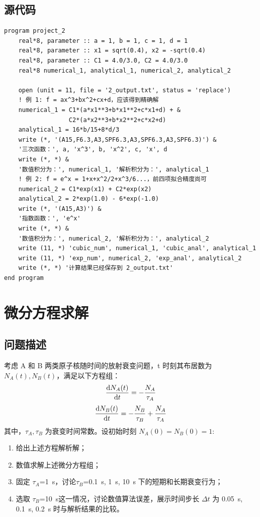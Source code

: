 \documentclass{ctexart}
\begin{document}
\subsection{源代码}
\begin{lstlisting}
program project_2
	real*8, parameter :: a = 1, b = 1, c = 1, d = 1
	real*8, parameter :: x1 = sqrt(0.4), x2 = -sqrt(0.4)
	real*8, parameter :: C1 = 4.0/3.0, C2 = 4.0/3.0
	real*8 numerical_1, analytical_1, numerical_2, analytical_2

	open (unit = 11, file = '2_output.txt', status = 'replace')
	! 例 1: f = ax^3+bx^2+cx+d，应该得到精确解
	numerical_1 = C1*(a*x1**3+b*x1**2+c*x1+d) + &
	              C2*(a*x2**3+b*x2**2+c*x2+d)
	analytical_1 = 16*b/15+8*d/3
	write (*, '(A15,F6.3,A3,SPF6.3,A3,SPF6.3,A3,SPF6.3)') &
	'三次函数：', a, 'x^3', b, 'x^2', c, 'x', d
	write (*, *) &
	'数值积分为：', numerical_1, '解析积分为：', analytical_1
	! 例 2: f = e^x = 1+x+x^2/2+x^3/6...，前四项拟合精度尚可
	numerical_2 = C1*exp(x1) + C2*exp(x2)
	analytical_2 = 2*exp(1.0) - 6*exp(-1.0)
	write (*, '(A15,A3)') &
	'指数函数：', 'e^x'
	write (*, *) &
	'数值积分为：', numerical_2, '解析积分为：', analytical_2
	write (11, *) 'cubic_num', numerical_1, 'cubic_anal', analytical_1
	write (11, *) 'exp_num', numerical_2, 'exp_anal', analytical_2
	write (*, *) '计算结果已经保存到 2_output.txt'
end program
\end{lstlisting}
\newpage
\section{微分方程求解}
\subsection{问题描述}
考虑 A 和 B 两类原子核随时间的放射衰变问题，t 时刻其布居数为 $N_A(t),N_B(t)$，满足以下方程组：
\[
\frac{\mathrm{d} N_A(t)}{\mathrm{d} t}=-\frac{N_A}{\tau_A}
\]
\[
\frac{\mathrm{d} N_B(t)}{\mathrm{d} t}=-\frac{N_B}{\tau_B}+\frac{N_A}{\tau_A}
\]
其中，$\tau_A,\tau_B$ 为衰变时间常数。设初始时刻 $N_A(0)=N_B(0)=1$:
\begin{enumerate}
    \item 给出上述方程解析解；
    \item 数值求解上述微分方程组；
    \item 固定 $\tau_A$=1~s，讨论$\tau_B$=0.1~s, 1~s, 10~s 下的短期和长期衰变行为；
    \item 选取 $\tau_B$=10~s这一情况，讨论数值算法误差，展示时间步长 $\Delta t$ 为 0.05~s, 0.1~s, 0.2~s 时与解析结果的比较。
\end{enumerate}
\end{document}
